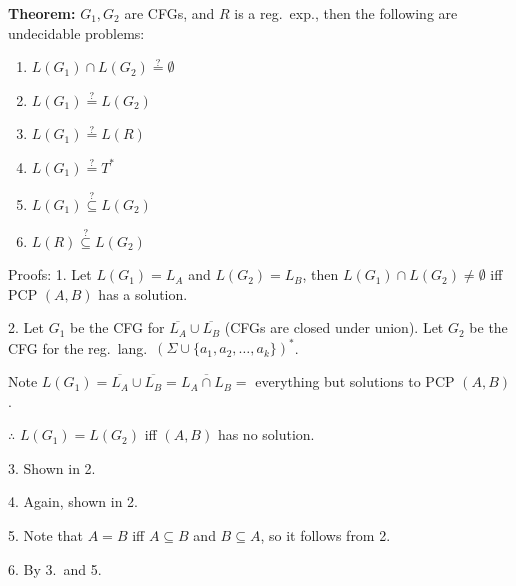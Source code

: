 \begin{frame}

{\bf Theorem:} $G_1,G_2$ are CFGs, and $R$ is a reg.\ exp., then the
following are undecidable problems:
\begin{enumerate}
\item  $L(G_1)\cap L(G_2)\stackrel{?}{=}\emptyset$
\item  $L(G_1)\stackrel{?}{=} L(G_2)$
\item  $L(G_1)\stackrel{?}{=} L(R)$
\item  $L(G_1)\stackrel{?}{=} T^*$
\item  $L(G_1)\stackrel{?}{\subseteq} L(G_2)$
\item  $L(R)\stackrel{?}{\subseteq} L(G_2)$
\end{enumerate}
\end{frame}

\begin{frame}
Proofs: 1. Let $L(G_1)=L_A$ and $L(G_2)=L_B$, then $L(G_1)\cap
L(G_2)\neq\emptyset$ iff PCP $(A,B)$ has a solution.

2.  Let $G_1$ be the CFG for $\overline{L_A}\cup\overline{L_B}$ (CFGs
are closed under union).  Let $G_2$ be the CFG for the reg.\ lang.\
$(\Sigma\cup\{a_1,a_2,\ldots,a_k\})^*$.  

Note
$L(G_1)=\overline{L_A}\cup\overline{L_B}=\overline{L_A\cap L_B}=$
everything but solutions to PCP $(A,B)$.

$\therefore$ $L(G_1)=L(G_2)$ iff $(A,B)$ has no solution.

3.  Shown in 2.

4.  Again, shown in 2.

5.  Note that $A=B$ iff $A\subseteq B$ and $B\subseteq A$, so it
follows from 2.

6.  By 3.\ and 5.
\end{frame}


